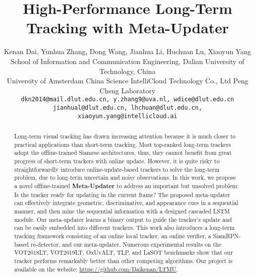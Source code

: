 \documentclass[10pt,twocolumn,letterpaper]{article}
\begin{document}
\title{High-Performance Long-Term Tracking with Meta-Updater}

\author{Kenan Dai, Yunhua Zhang, Dong Wang, Jianhua Li, Huchuan Lu, Xiaoyun Yang\\
\normalsize{School of Information and Communication Engineering, Dalian University of Technology, China}\\
\normalsize{University of Amsterdam} \quad
\normalsize{China Science IntelliCloud Technology Co., Ltd} \quad
\normalsize{Peng Cheng Laboratory}\\
{\tt\small dkn2014@mail.dlut.edu.cn, y.zhang9@uva.nl, wdice@dlut.edu.cn}\\
{\tt\small jianhual@dlut.edu.cn, lhchuan@dlut.edu.cn, xiaoyun.yang@intellicloud.ai}
}

\maketitle
\thispagestyle{empty}

\begin{abstract}
Long-term visual tracking has drawn increasing attention because it is
much closer to practical applications than short-term tracking.
Most top-ranked long-term trackers adopt the offline-trained
Siamese architectures, thus, they cannot benefit from great
progress of short-term trackers with online update.
However, it is quite risky to straightforwardly introduce online-update-based
trackers to solve the long-term problem, due to long-term uncertain and noisy
observations.
In this work, we propose a novel offline-trained \textbf{Meta-Updater}
to address an important but unsolved problem: Is the tracker
ready for updating in the current frame?
The proposed meta-updater can effectively integrate geometric,
discriminative, and appearance cues in a sequential manner, and
then mine the sequential information with a designed cascaded
LSTM module.
Our meta-updater learns a binary output to guide the tracker's update
and can be easily embedded into different trackers.
This work also introduces a long-term tracking framework consisting
of an online local tracker, an online verifier, a SiamRPN-based re-detector,
and our meta-updater.
Numerous experimental results on the VOT2018LT, VOT2019LT, OxUvALT,
TLP, and LaSOT benchmarks show that our tracker performs remarkably
better than other competing algorithms.
Our project is available on the
website: \url{https://github.com/Daikenan/LTMU}.
\end{abstract}

\vspace{-4mm}
\end{document}
